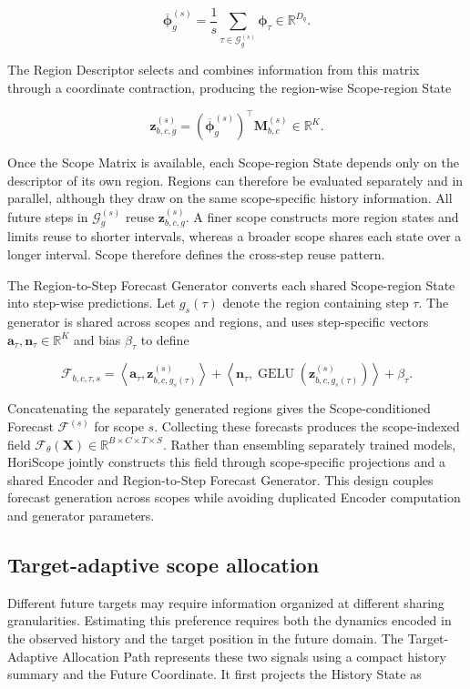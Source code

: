 \[
\overline{\boldsymbol\phi}_g^{(s)}
=
\frac{1}{s}
\sum_{\tau\in\mathcal G_g^{(s)}}
\boldsymbol\phi_\tau
\in\mathbb R^{D_q}.
\]


The Region Descriptor selects and combines information from this matrix through a coordinate contraction, producing the region-wise Scope-region State

\[
\mathbf z_{b,c,g}^{(s)}
=
\left(\overline{\boldsymbol\phi}_g^{(s)}\right)^\top
\mathbf M_{b,c}^{(s)}
\in\mathbb R^K.
\]


Once the Scope Matrix is available, each Scope-region State depends only on the descriptor of its own region. Regions can therefore be evaluated separately and in parallel, although they draw on the same scope-specific history information. All future steps in $\mathcal G_g^{(s)}$ reuse $\mathbf z_{b,c,g}^{(s)}$. A finer scope constructs more region states and limits reuse to shorter intervals, whereas a broader scope shares each state over a longer interval. Scope therefore defines the cross-step reuse pattern.

The Region-to-Step Forecast Generator converts each shared Scope-region State into step-wise predictions. Let $g_s(\tau)$ denote the region containing step $\tau$. The generator is shared across scopes and regions, and uses step-specific vectors $\mathbf a_\tau,\mathbf n_\tau\in\mathbb R^K$ and bias $\beta_\tau$ to define

\[
\mathcal F_{b,c,\tau,s}
=
\left\langle
\mathbf a_\tau,
\mathbf z_{b,c,g_s(\tau)}^{(s)}
\right\rangle
+
\left\langle
\mathbf n_\tau,
\operatorname{GELU}\!\left(
\mathbf z_{b,c,g_s(\tau)}^{(s)}
\right)
\right\rangle
+
\beta_\tau.
\]


Concatenating the separately generated regions gives the Scope-conditioned Forecast $\mathcal F^{(s)}$ for scope $s$. Collecting these forecasts produces the scope-indexed field $\mathcal F_\theta(\mathbf X)\in\mathbb R^{B\times C\times T\times S}$. Rather than ensembling separately trained models, HoriScope jointly constructs this field through scope-specific projections and a shared Encoder and Region-to-Step Forecast Generator. This design couples forecast generation across scopes while avoiding duplicated Encoder computation and generator parameters.

\subsection{Target-adaptive scope allocation}


Different future targets may require information organized at different sharing granularities. Estimating this preference requires both the dynamics encoded in the observed history and the target position in the future domain. The Target-Adaptive Allocation Path represents these two signals using a compact history summary and the Future Coordinate. It first projects the History State as

